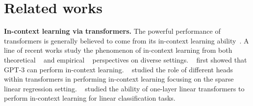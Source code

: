 \section{Related works}
\textbf{In-context learning via transformers.}
The powerful performance of transformers is generally believed to come from its in-context learning ability~\cite{brown2020language,chen2022meta,min2022metaicl,liu2023pre,xieexplanation}. A line of recent works study the phenomenon of in-context learning from both theoretical ~\cite{bai2024transformers,guotransformers,lintransformers,chen2024transformers, frei2024trained,huangcontext,siyu2024training,lifine} and empirical ~\cite{garg2022can,akyurek2022learning,li2023transformersa,raventos2024pretraining,pathaktransformers,panwarcontext,bhattamishraunderstanding,fu2023does,lee2024supervised} perspectives on diverse settings. ~\citet{brown2020language} first showed that GPT-3 can perform in-context learning. 
~\citet{chen2024transformers} studied the role of different heads within transformers in performing in-context learning focusing on the sparse linear regression setting. ~\citet{frei2024trained} %
studied the ability of one-layer linear transformers to perform in-context learning for %
linear classification tasks. 



